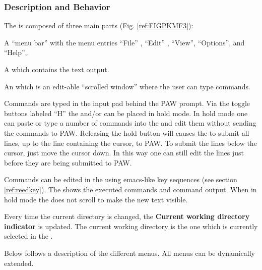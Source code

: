 \subsubsection{Description and Behavior}

The \EW{} is composed of three main parts (Fig. \ref{ref:FIGPKMF3}):

\begin{UL}
\item A ``menu bar'' with the menu entries ``File'' ,  ``Edit'' 
      , ``View'', ``Options'', and ``Help'',.
\item A \TP{}  which contains the text output.
\item An \INP{}  which is an edit-able ``scrolled window'' where the 
      user can type commands.
\end{UL}

Commands are typed in the input pad behind the PAW prompt. Via the 
toggle buttons  labeled ``H'' the \INP{} and/or \TP{} can be placed in
hold mode. In hold mode one can paste or type a number of commands into the 
\INP{} and edit them without sending the commands to PAW. Releasing 
the hold button will causes the \EW{} to submit all lines, up to the line 
containing the cursor, to PAW. To submit the lines below the cursor,
just move the cursor down. In this way one can still edit the lines just before 
they are being submitted to PAW.

Commands can be edited in the \INP{} using emacs-like key sequences (see 
section \ref{ref:reedkey}). The \TP{} shows the executed commands and command 
output. When in hold mode the \TP{} does not scroll to make the new text 
visible.

Every time the current directory is changed, the {\bf Current working directory 
indicator}  is updated. The current working directory is the one which 
is currently selected in the \MB{}.

Below follows a description of the different \EW{} menus. All \EW{} menus can 
be dynamically extended.

